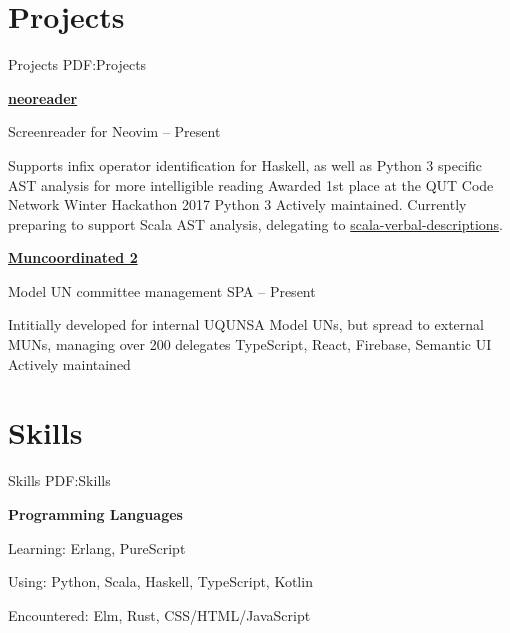 \documentclass[a4paper,10pt,oneside]{article}
\begin{document}
\begin{body}
\section
{Projects}
{Projects}
{PDF:Projects}


\href{https://github.com/MaxwellBo/neoreader}{\textbf{neoreader}} 
\par Screenreader for Neovim\hfill {} -- Present
\begin{detail}
	\BulletItem Supports infix operator identification for Haskell, as well as Python 3 specific AST analysis for more intelligible reading
	\BulletItem Awarded 1st place at the QUT Code Network Winter Hackathon 2017
	\BulletItem Python 3
	\BulletItem Actively maintained. Currently preparing to support Scala AST analysis, delegating to \href{https://github.com/MaxwellBo/scala-verbal-descriptions}{scala-verbal-descriptions}.
\end{detail}


\EntryGap

\href{https://github.com/MaxwellBo/Muncoordinated-2}{\textbf{Muncoordinated 2}}
\par Model UN committee management SPA\hfill {} -- Present
\begin{detail}
	\BulletItem Intitially developed for internal UQUNSA Model UNs, but spread to external MUNs, managing over 200 delegates
	\BulletItem TypeScript, React, Firebase, Semantic UI
	\BulletItem Actively maintained
\end{detail}



\section
{Skills}
{Skills}
{PDF:Skills}

\textbf{Programming Languages}
\par Learning: Erlang, PureScript
\par Using: Python, Scala, Haskell, TypeScript, Kotlin
\par Encountered: Elm, Rust, CSS/HTML/JavaScript


\end{body}
\end{document}
